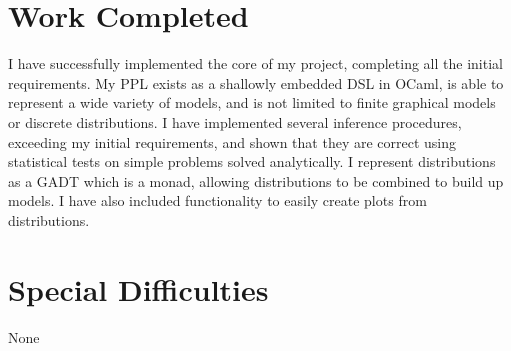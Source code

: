 \section*{Work Completed}
I have successfully implemented the core of my project, completing all the initial requirements. My PPL exists as a shallowly embedded DSL in OCaml, is able to represent a wide variety of models, and is not limited to finite graphical models or discrete distributions. I have implemented several inference procedures, exceeding my initial requirements, and shown that they are correct using statistical tests on simple problems solved analytically. I represent distributions as a GADT which is a monad, allowing distributions to be combined to build up models. I have also included functionality to easily create plots from distributions.


\section*{Special Difficulties}
None
